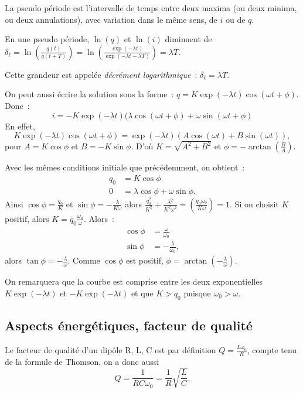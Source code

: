 La pseudo période est l'intervalle de temps entre deux maxima (ou deux minima, ou deux annulations), avec variation dans le même sens, de $i$ ou de $q$.

En une pseudo période, $\ln(q)$ et $\ln(i)$ diminuent de $\delta_\ell = \ln\left(\frac{q(t)}{q(t+T)}\right) = \ln\left(\frac{\exp(-\lambda t)}{\exp(-\lambda t-\lambda T)}\right)=\lambda T$.

Cette grandeur est appelée \emph{décrément logarithmique}~: $\delta_\ell = \lambda T$.

On peut aussi écrire la solution sous la forme~: $q=K\exp(-\lambda t) \cos(\omega t +\phi)$. Donc~:
\begin{equation}
i = -K\exp(-\lambda t)(\lambda\cos(\omega t + \phi)+\omega\sin(\omega t +\phi)
\end{equation}
En effet,
\begin{equation}
K\exp(-\lambda t) \cos(\omega t +\phi) = \exp(-\lambda t)(A\cos(\omega t) + B\sin(\omega t)),
\end{equation}
pour $A=K\cos \phi$ et $B=-K\sin \phi$. D'où $K=\sqrt{A^2+B^2}$ et $\phi = -\arctan\left(\frac{B}{A}\right).$

Avec les mêmes conditions initiale que précédemment, on obtient~:
\begin{align}
q_0 &=K\cos \phi \\ 0 &= \lambda\cos\phi + \omega\sin\phi.
\end{align}
Ainsi $\cos\phi = \frac{q_0}{K}$ et $\sin\phi = -\frac{\lambda}{K\omega}$ alors $\frac{q_0^2}{K^2} + \frac{\lambda^2}{K^2\omega^2}= \left(\frac{q_0 \omega_0}{K\omega}\right)=1$. Si on choisit $K$ positif, alors $K=q_0 \frac{\omega_0}{\omega}$. Alors~:
\begin{align}
\cos\phi &= \frac{\omega}{\omega_0} \\ \sin\phi&=-\frac{\lambda}{\omega_0},
\end{align}
alors $\tan \phi = -\frac{\lambda}{\omega}$. Comme $\cos\phi$ est positif, $\phi = \arctan\left(-\frac{\lambda}{\omega}\right)$.

On remarquera que la courbe est comprise entre les deux exponentielles $K\exp(-\lambda t)$ et $-K\exp(-\lambda t)$ et que $K>q_0$ puisque $\omega_0>\omega$.

\subsection{Aspects énergétiques, facteur de qualité}

Le facteur de qualité d'un dipôle R, L, C est par définition $Q = \frac{L\omega_0}{R}$, compte tenu de la formule de Thomson, on a donc aussi
\begin{equation}
Q = \frac{1}{RC \omega_0} = \frac{1}{R}\sqrt{\frac{L}{C}}.
\end{equation}

